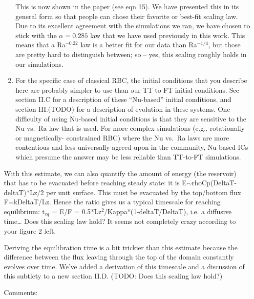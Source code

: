 \documentclass[aps, 11pt, singlecolumn]{revtex4-1} %
\begin{document}
\begin{singlespace}
\begin{enumerate}
This is now shown in the paper (see eqn 15).
We have presented this in its general form so that people can chose their favorite or best-fit scaling law.
Due to its excellent agreement with the simulations we ran, we have chosen to stick with the $\alpha = 0.285$ law that we have used previously in this work.
This means that a Ra$^{-0.22}$ law is a better fit for our data than Ra$^{-1/4}$, but those are pretty hard to distinguish between; so -- yes, this scaling roughly holds in our simulations.
\item For the specific case of classical RBC, the initial conditions that you describe here are probably simpler to use than our TT-to-FT initial conditions.
See section II.C for a description of these ``Nu-based'' initial conditions, and section III.(TODO) for a description of evolution in these systems.
One difficulty of using Nu-based initial conditions is that they are sensitive to the Nu vs.~Ra law that is used.
For more complex simulations (e.g., rotationally- or magnetically- constrained RBC) where the Nu vs.~Ra laws are more contentious and less universally agreed-upon in the community, Nu-based ICs which presume the answer may be less reliable than TT-to-FT simulations.
\end{enumerate}


\begin{myquotation}
With this estimate, we can also quantify the amount of energy (the reservoir) that has to be evacuated before reaching steady state: it is E$\sim$rhoCp(DeltaT-deltaT)*Lz/2 per unit surface. 
This must be evacuated by the top/bottom flux F=kDeltaT/Lz. 
Hence the ratio gives us a typical timescale for reaching equilibrium: t$_{eq}$ = E/F = 0.5*Lz$^2$/Kappa*(1-deltaT/DeltaT), i.e. a diffusive time…
Does this scaling law hold? It seems not completely crazy according to your figure 2 left.
\end{myquotation}
Deriving the equilibration time is a bit trickier than this estimate because the difference between the flux leaving through the top of the domain constantly evolves over time.
We've added a derivation of this timescale and a discussion of this subtlety to a new section II.D.
(TODO: Does this scaling law hold?)

\begin{myquotation}
Comments:


\end{myquotation}
\end{singlespace}
\end{document}
